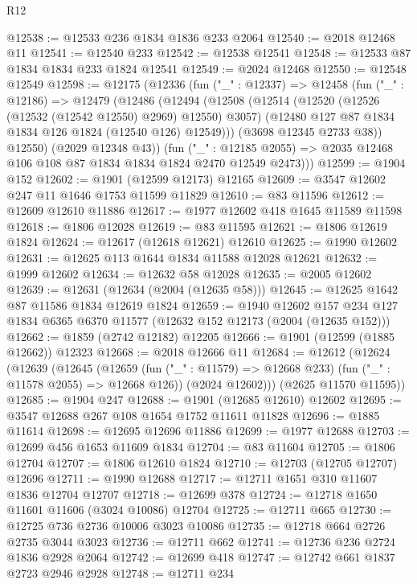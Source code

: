 \begin{lexlean}{R12}
\begin{coremodule}
@12538 := @12533 @236 @1834 @1836 @233 @2064
@12540 := @2018 @12468 @11
@12541 := @12540 @233
@12542 := @12538 @12541
@12548 := @12533 @87 @1834 @1834 @233 @1824 @12541
@12549 := @2024 @12468
@12550 := @12548 @12549
@12598 := @12175
    (@12336
      (fun ("_" : @12337) =>
      @12458
        (fun ("_" : @12186) =>
        @12479
          (@12486
            (@12494
              (@12508
                (@12514
                  (@12520 (@12526 (@12532 (@12542 @12550) @2969) @12550) @3057)
                  (@12480 @127 @87 @1834 @1834 @126 @1824 (@12540 @126) @12549)))
              (@3698 @12345 @2733 @38))
            @12550)
          (@2029 @12348 @43))
        (fun ("_" : @12185 @2055) =>
        @2035 @12468 @106 @108 @87 @1834 @1834 @1824 @2470 @12549 @2473)))
@12599 := @1904 @152
@12602 := @1901 (@12599 @12173) @12165
@12609 := @3547 @12602 @247 @11 @1646 @1753 @11599 @11829
@12610 := @83 @11596
@12612 := @12609 @12610 @11886
@12617 := @1977 @12602 @418 @1645 @11589 @11598
@12618 := @1806 @12028
@12619 := @83 @11595
@12621 := @1806 @12619 @1824
@12624 := @12617 (@12618 @12621) @12610
@12625 := @1990 @12602
@12631 := @12625 @113 @1644 @1834 @11588 @12028 @12621
@12632 := @1999 @12602
@12634 := @12632 @58 @12028
@12635 := @2005 @12602
@12639 := @12631 (@12634 (@2004 (@12635 @58)))
@12645 := @12625 @1642 @87 @11586 @1834 @12619 @1824
@12659 := @1940
    @12602
    @157
    @234
    @127
    @1834
    @6365
    @6370
    @11577
    (@12632 @152 @12173 (@2004 (@12635 @152)))
@12662 := @1859 (@2742 @12182) @12205
@12666 := @1901 (@12599 (@1885 @12662)) @12323
@12668 := @2018 @12666 @11
@12684 := @12612
    (@12624
      (@12639
        (@12645
          (@12659 (fun ("_" : @11579) => @12668 @233) (fun ("_" : @11578 @2055) => @12668 @126))
          (@2024 @12602)))
      (@2625 @11570 @11595))
@12685 := @1904 @247
@12688 := @1901 (@12685 @12610) @12602
@12695 := @3547 @12688 @267 @108 @1654 @1752 @11611 @11828
@12696 := @1885 @11614
@12698 := @12695 @12696 @11886
@12699 := @1977 @12688
@12703 := @12699 @456 @1653 @11609 @1834
@12704 := @83 @11604
@12705 := @1806 @12704
@12707 := @1806 @12610 @1824
@12710 := @12703 (@12705 @12707) @12696
@12711 := @1990 @12688
@12717 := @12711 @1651 @310 @11607 @1836 @12704 @12707
@12718 := @12699 @378
@12724 := @12718 @1650 @11601 @11606 (@3024 @10086) @12704
@12725 := @12711 @665
@12730 := @12725 @736 @2736 @10006 @3023 @10086
@12735 := @12718 @664 @2726 @2735 @3044 @3023
@12736 := @12711 @662
@12741 := @12736 @236 @2724 @1836 @2928 @2064
@12742 := @12699 @418
@12747 := @12742 @661 @1837 @2723 @2946 @2928
@12748 := @12711 @234

\end{coremodule}
\end{lexlean}
